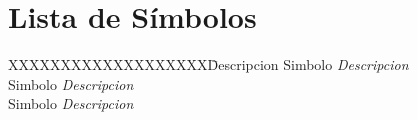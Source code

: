 \chapter*{Lista de S\'imbolos}\label{simbolos}

\begin{tabbing}
XXXXXXXXXXXXXXXXXXX\=Descripcion\kill
Simbolo \> {\it Descripcion }\\
Simbolo \> {\it Descripcion}\\
Simbolo \> {\it Descripcion}\\
\end{tabbing}